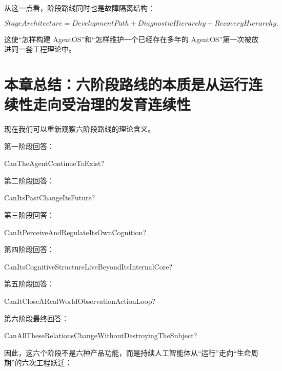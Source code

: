 从这一点看，阶段路线同时也是故障隔离结构：

\[
\boxed{
StageArchitecture
=
DevelopmentPath
+
DiagnosticHierarchy
+
RecoveryHierarchy.
}
\]

这使“怎样构建 AgentOS”和“怎样维护一个已经存在多年的 AgentOS”第一次被放进同一套工程理论中。

\section{本章总结：六阶段路线的本质是从运行连续性走向受治理的发育连续性}

现在我们可以重新观察六阶段路线的理论含义。

第一阶段回答：

\begin{statementbox}
CanTheAgentContinueToExist?
\end{statementbox}

第二阶段回答：

\begin{statementbox}
CanItsPastChangeItsFuture?
\end{statementbox}

第三阶段回答：

\begin{statementbox}
CanItPerceiveAndRegulateItsOwnCognition?
\end{statementbox}

第四阶段回答：

\begin{statementbox}
CanItsCognitiveStructureLiveBeyondItsInternalCore?
\end{statementbox}

第五阶段回答：

\begin{statementbox}
CanItCloseARealWorldObservationActionLoop?
\end{statementbox}

第六阶段最终回答：

\begin{statementbox}
CanAllTheseRelationsChangeWithoutDestroyingTheSubject?
\end{statementbox}

因此，这六个阶段不是六种产品功能，而是持续人工智能体从“运行”走向“生命周期”的六次工程跃迁：

\begin{statementbox}
\centering
{}
\end{statementbox}

